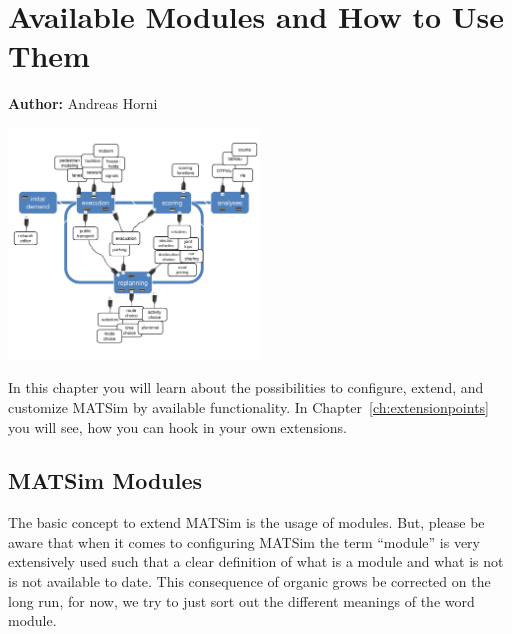 \chapter{Available Modules and How to Use Them}
\label{ch:modules}

\hfill \textbf{Author:} Andreas Horni

\begin{center} \includegraphics[width=0.5\textwidth, angle=0]{extending/figures/modules.pdf} \end{center}

In this chapter you will learn about the possibilities to configure, extend, and customize MATSim by available functionality. In Chapter~\ref{ch:extensionpoints} you will see, how you can hook in your own extensions.

\section{MATSim Modules}
The basic concept to extend MATSim is the usage of modules. But, please be aware that when it comes to configuring MATSim the term ``module'' is very extensively used such that a clear definition of what is a module and what is not is not available to date. This consequence of organic grows be corrected on the long run, for now, we try to just sort out the different meanings of the word module.


